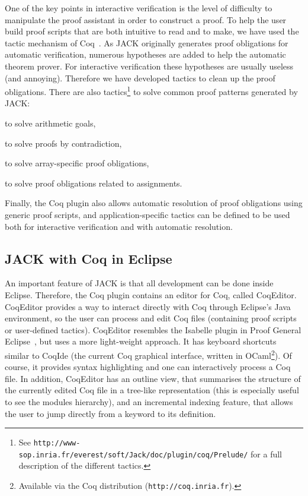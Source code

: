 One of the key points in interactive verification is the level of
difficulty to manipulate the proof assistant in order to construct a
proof.  To help the user build proof scripts that are both intuitive
to read and to make, we have used the tactic mechanism of
Coq~\cite{DEL-00-LTAC}.  As JACK originally generates proof obligations for
automatic verification, numerous hypotheses are added to help the
automatic theorem prover. For interactive verification these
hypotheses are usually useless (and annoying). Therefore we have
developed tactics to clean up the proof obligations. There are also
tactics\footnote{ See
\texttt{http://www-sop.inria.fr/everest/soft/Jack/doc/plugin/coq/Prelude/}
for a full description of the different tactics.}  to solve common
proof patterns generated by JACK: 
\begin{inparaenum}
\item to solve arithmetic goals,
\item to solve proofs by contradiction,
\item to solve array-specific proof obligations,
\item to solve proof obligations related to assignments.
\end{inparaenum}
Finally, the Coq plugin also allows automatic resolution of proof
obligations using generic proof scripts, and application-specific
tactics can be defined to be used both for interactive verification
and with automatic resolution.



\subsection{JACK with Coq in Eclipse}

An important feature of JACK is that all development can be done
inside Eclipse.  Therefore, the Coq plugin contains an editor for Coq,
called CoqEditor. CoqEditor provides a way to interact directly with
Coq through Eclipse's Java environment, so the user can process and
edit Coq files (containing proof scripts or user-defined tactics).
CoqEditor resembles the Isabelle plugin in Proof General
Eclipse~\cite{WintersteinAL05}, but uses a more light-weight approach.
It has keyboard shortcuts similar to CoqIde (the current Coq graphical
interface, written in OCaml\footnote{Available via the Coq
distribution (\texttt{http://coq.inria.fr}).}). Of course, it provides
syntax highlighting and one can interactively process a Coq file.  In
addition, CoqEditor has an outline view, that summarises the structure
of the currently edited Coq file in a tree-like representation (this
is especially useful to see the modules hierarchy), and an incremental
indexing feature, that allows the user to jump directly from a keyword
to its definition.


